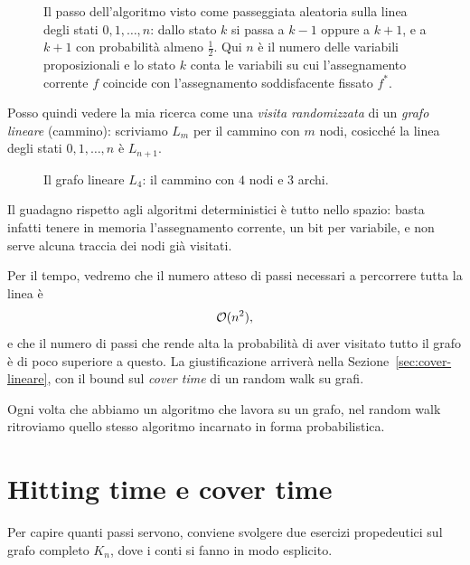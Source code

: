 \begin{figure}[H]
\centering

\caption{Il passo dell'algoritmo visto come passeggiata aleatoria sulla linea degli stati
$0,1,\dots,n$: dallo stato $k$ si passa a $k-1$ oppure a $k+1$, e a $k+1$ con probabilità
almeno $\tfrac12$. Qui $n$ è il numero delle variabili proposizionali e lo stato $k$ conta le
variabili su cui l'assegnamento corrente $f$ coincide con l'assegnamento soddisfacente
fissato $f^{*}$.}
\end{figure}

Posso quindi vedere la mia ricerca come una \emph{visita randomizzata} di un \emph{grafo
lineare} (cammino): scriviamo $L_m$ per il cammino con $m$ nodi, cosicché la linea degli stati
$0,1,\dots,n$ è $L_{n+1}$.

\begin{figure}[H]
\centering

\caption{Il grafo lineare $L_4$: il cammino con $4$ nodi e $3$ archi.}
\end{figure}

Il guadagno rispetto agli algoritmi deterministici è tutto nello spazio: basta infatti tenere
in memoria l'assegnamento corrente, un bit per variabile, e non serve alcuna traccia dei nodi
già visitati.
\begin{center}
\end{center}

Per il tempo, vedremo che il numero atteso di passi necessari a percorrere tutta la linea è
\[
  \mathcal{O}(n^{2}),
\]
e che il numero di passi che rende alta la probabilità di aver visitato tutto il grafo è di
poco superiore a questo. La giustificazione arriverà nella Sezione~\ref{sec:cover-lineare},
con il bound sul \emph{cover time} di un random walk su grafi.

\begin{osservazione}
Ogni volta che abbiamo un algoritmo che lavora su un grafo, nel random walk ritroviamo quello
stesso algoritmo incarnato in forma probabilistica.
\end{osservazione}

\section{Hitting time e cover time}

Per capire quanti passi servono, conviene svolgere due esercizi propedeutici sul grafo
completo $K_n$, dove i conti si fanno in modo esplicito.

